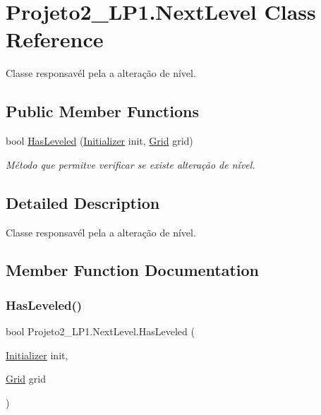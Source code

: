 \hypertarget{class_projeto2___l_p1_1_1_next_level}{}\section{Projeto2\+\_\+\+L\+P1.\+Next\+Level Class Reference}
\label{class_projeto2___l_p1_1_1_next_level}


Classe responsavél pela a alteração de nível.  


\subsection*{Public Member Functions}
\begin{DoxyCompactItemize}
\item 
bool \mbox{\hyperlink{class_projeto2___l_p1_1_1_next_level_a764bc30386963ac3ae624c59468a925b}{Has\+Leveled}} (\mbox{\hyperlink{class_projeto2___l_p1_1_1_initializer}{Initializer}} init, \mbox{\hyperlink{class_projeto2___l_p1_1_1_grid}{Grid}} grid)
\begin{DoxyCompactList}\small\item\em Método que permitve verificar se existe alteração de nível. \end{DoxyCompactList}\end{DoxyCompactItemize}


\subsection{Detailed Description}
Classe responsavél pela a alteração de nível. 



\subsection{Member Function Documentation}
\mbox{\label{class_projeto2___l_p1_1_1_next_level_a764bc30386963ac3ae624c59468a925b}} 
\subsubsection{\texorpdfstring{Has\+Leveled()}{HasLeveled()}}
{\footnotesize\ttfamily bool Projeto2\+\_\+\+L\+P1.\+Next\+Level.\+Has\+Leveled (\begin{DoxyParamCaption}\item[{\mbox{\hyperlink{class_projeto2___l_p1_1_1_initializer}{Initializer}}}]{init,  }\item[{\mbox{\hyperlink{class_projeto2___l_p1_1_1_grid}{Grid}}}]{grid }\end{DoxyParamCaption})\hspace{0.3cm}{\ttfamily [inline]}}



